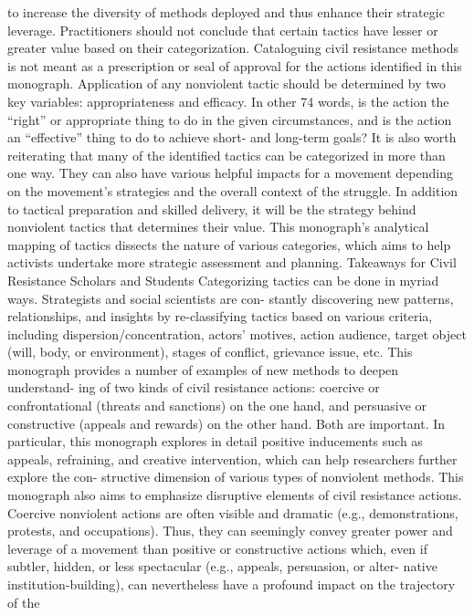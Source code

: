 \documentclass[twoside,a4paper,12pt,fleqn,openany]{extbook}
\begin{document}
to increase the diversity of methods deployed and thus enhance their strategic leverage.
Practitioners should not conclude that certain tactics have lesser or greater value based
on their categorization. Cataloguing civil resistance methods is not meant as a prescription
or seal of approval for the actions identified in this monograph. Application of any nonviolent
tactic should be determined by two key variables: appropriateness and efficacy. In other
74
words, is the action the “right” or appropriate thing to do in the given circumstances, and is
the action an “effective” thing to do to achieve short- and long-term goals?
It is also worth reiterating that many of the identified tactics can be categorized in more
than one way. They can also have various helpful impacts for a movement depending on the
movement’s strategies and the overall context of the struggle. In addition to tactical preparation
and skilled delivery, it will be the strategy behind nonviolent tactics that determines their value.
This monograph’s analytical mapping of tactics dissects the nature of various categories, which
aims to help activists undertake more strategic assessment and planning.
Takeaways for Civil Resistance Scholars and Students
Categorizing tactics can be done in myriad ways. Strategists and social scientists are con-
stantly discovering new patterns, relationships, and insights by re-classifying tactics based
on various criteria, including dispersion/concentration, actors’ motives, action audience, target
object (will, body, or environment), stages of conflict, grievance issue, etc.
This monograph provides a number of examples of new methods to deepen understand-
ing of two kinds of civil resistance actions: coercive or confrontational (threats and sanctions)
on the one hand, and persuasive or constructive (appeals and rewards) on the other hand.
Both are important.
In particular, this monograph explores in detail positive inducements such as appeals,
refraining, and creative intervention, which can help researchers further explore the con-
structive dimension of various types of nonviolent methods. This monograph also aims to
emphasize disruptive elements of civil resistance actions. Coercive nonviolent actions are
often visible and dramatic (e.g., demonstrations, protests, and occupations). Thus, they can
seemingly convey greater power and leverage of a movement than positive or constructive
actions which, even if subtler, hidden, or less spectacular (e.g., appeals, persuasion, or alter-
native institution-building), can nevertheless have a profound impact on the trajectory of the
\end{document}
